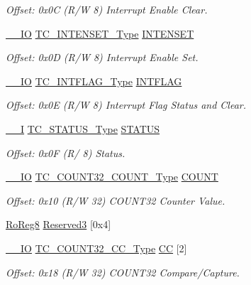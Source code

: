\begin{DoxyCompactItemize}
\begin{DoxyCompactList}\small\item\em Offset\+: 0x0C (R/W 8) Interrupt Enable Clear. \end{DoxyCompactList}\item 
\mbox{\hyperlink{core__cm0plus_8h_aec43007d9998a0a0e01faede4133d6be}{\+\_\+\+\_\+\+IO}} \mbox{\hyperlink{union_t_c___i_n_t_e_n_s_e_t___type}{T\+C\+\_\+\+I\+N\+T\+E\+N\+S\+E\+T\+\_\+\+Type}} \mbox{\hyperlink{struct_tc_count32_a59e384762759e5950e3d32d1f3b358d6}{I\+N\+T\+E\+N\+S\+ET}}
\begin{DoxyCompactList}\small\item\em Offset\+: 0x0D (R/W 8) Interrupt Enable Set. \end{DoxyCompactList}\item 
\mbox{\hyperlink{core__cm0plus_8h_aec43007d9998a0a0e01faede4133d6be}{\+\_\+\+\_\+\+IO}} \mbox{\hyperlink{union_t_c___i_n_t_f_l_a_g___type}{T\+C\+\_\+\+I\+N\+T\+F\+L\+A\+G\+\_\+\+Type}} \mbox{\hyperlink{struct_tc_count32_a076bcac2737bf4d77b94d8ca8362a8f0}{I\+N\+T\+F\+L\+AG}}
\begin{DoxyCompactList}\small\item\em Offset\+: 0x0E (R/W 8) Interrupt Flag Status and Clear. \end{DoxyCompactList}\item 
\mbox{\hyperlink{core__cm0plus_8h_af63697ed9952cc71e1225efe205f6cd3}{\+\_\+\+\_\+I}} \mbox{\hyperlink{union_t_c___s_t_a_t_u_s___type}{T\+C\+\_\+\+S\+T\+A\+T\+U\+S\+\_\+\+Type}} \mbox{\hyperlink{struct_tc_count32_af7f33b0963c8311ce45fe0f929a1a9c5}{S\+T\+A\+T\+US}}
\begin{DoxyCompactList}\small\item\em Offset\+: 0x0F (R/ 8) Status. \end{DoxyCompactList}\item 
\mbox{\hyperlink{core__cm0plus_8h_aec43007d9998a0a0e01faede4133d6be}{\+\_\+\+\_\+\+IO}} \mbox{\hyperlink{union_t_c___c_o_u_n_t32___c_o_u_n_t___type}{T\+C\+\_\+\+C\+O\+U\+N\+T32\+\_\+\+C\+O\+U\+N\+T\+\_\+\+Type}} \mbox{\hyperlink{struct_tc_count32_a452553d1482d934c1c9530e31a465d0f}{C\+O\+U\+NT}}
\begin{DoxyCompactList}\small\item\em Offset\+: 0x10 (R/W 32) C\+O\+U\+N\+T32 Counter Value. \end{DoxyCompactList}\item 
\mbox{\hyperlink{group___s_a_m_d21_e15_a__definitions_ga0d957f1433aaf5d70e4dc2b68288442d}{Ro\+Reg8}} \mbox{\hyperlink{struct_tc_count32_a85a9b205a274d973876024028f9ec39b}{Reserved3}} \mbox{[}0x4\mbox{]}
\item 
\mbox{\hyperlink{core__cm0plus_8h_aec43007d9998a0a0e01faede4133d6be}{\+\_\+\+\_\+\+IO}} \mbox{\hyperlink{union_t_c___c_o_u_n_t32___c_c___type}{T\+C\+\_\+\+C\+O\+U\+N\+T32\+\_\+\+C\+C\+\_\+\+Type}} \mbox{\hyperlink{struct_tc_count32_a0775f63da77974d2a0882ce94fa9acff}{CC}} \mbox{[}2\mbox{]}
\begin{DoxyCompactList}\small\item\em Offset\+: 0x18 (R/W 32) C\+O\+U\+N\+T32 Compare/\+Capture. \end{DoxyCompactList}\end{DoxyCompactItemize}


